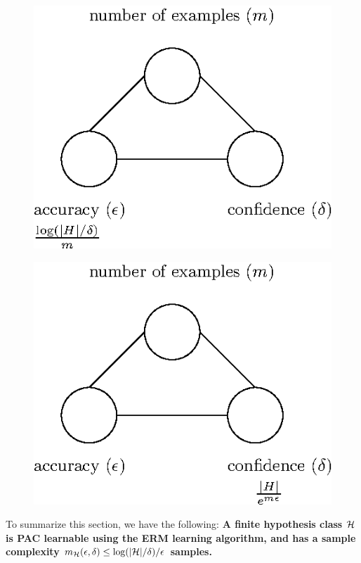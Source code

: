 {\begin{figure}[h!]
	\centering\includegraphics[scale=0.8]{chapters/pac/figures/connection_m_eps_delta_finite2.eps}
\end{figure}


\begin{figure}[h!]
	\centering\includegraphics[scale=0.8]{chapters/pac/figures/connection_m_eps_delta_finite3.eps}
\end{figure}

To summarize this section, we have  the following:
{\bf A finite hypothesis class $\mathcal{H}$ is PAC learnable using the ERM learning algorithm, and has a sample complexity  $m_{\mathcal{H}}(\epsilon,\delta)\leq \log(|\mathcal{H}|/\delta)/\epsilon$ samples.}

}
